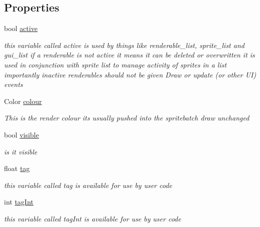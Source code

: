 \subsection*{Properties}
\begin{DoxyCompactItemize}
\item 
bool \mbox{\hyperlink{class_r_c___framework_1_1_r_c___renderable_a192f8ec61fb5e94770fcb3a1f9ae3449}{active}}
\begin{DoxyCompactList}\small\item\em this variable called active is used by things like renderable\+\_\+list, sprite\+\_\+list and gui\+\_\+list if a renderable is not active it means it can be deleted or overwritten it is used in conjunction with sprite list to manage activity of sprites in a list importantly inactive renderables should not be given Draw or update (or other UI) events \end{DoxyCompactList}\item 
Color \mbox{\hyperlink{class_r_c___framework_1_1_r_c___renderable_ad2731b86927b47a6f661f18446332afc}{colour}}
\begin{DoxyCompactList}\small\item\em This is the render colour its usually pushed into the spritebatch draw unchanged \end{DoxyCompactList}\item 
bool \mbox{\hyperlink{class_r_c___framework_1_1_r_c___renderable_a27490992e58f8295c86cd3ed1d79d937}{visible}}
\begin{DoxyCompactList}\small\item\em is it visible \end{DoxyCompactList}\item 
float \mbox{\hyperlink{class_r_c___framework_1_1_r_c___renderable_a892d384578d86317fc3975ce977f89ef}{tag}}
\begin{DoxyCompactList}\small\item\em this variable called tag is available for use by user code \end{DoxyCompactList}\item 
int \mbox{\hyperlink{class_r_c___framework_1_1_r_c___renderable_ab429caeeb6b5ce111036e1828b5b3777}{tag\+Int}}
\begin{DoxyCompactList}\small\item\em this variable called tag\+Int is available for use by user code \end{DoxyCompactList}\end{DoxyCompactItemize}


